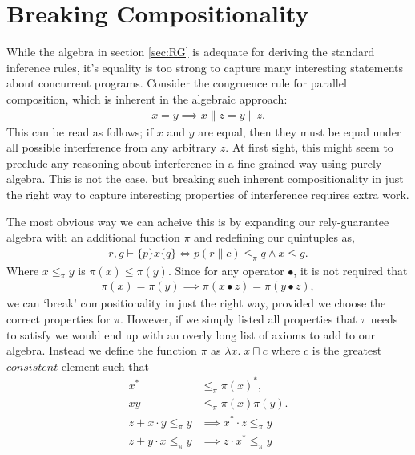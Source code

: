 \documentclass{llncs}
\begin{document}
\section{Breaking Compositionality}
\label{sec:INT}

While the algebra in section \ref{sec:RG} is adequate for deriving the
standard inference rules, it's equality is too strong to capture many
interesting statements about concurrent programs. Consider the
congruence rule for parallel composition, which is inherent in the
algebraic approach:
\begin{align*}
x = y \implies x\|z = y\|z.
\end{align*}
This can be read as follows; if $x$ and $y$ are equal, then they must
be equal under all possible interference from any arbitrary $z$. At
first sight, this might seem to preclude any reasoning about
interference in a fine-grained way using purely algebra. This is not
the case, but breaking such inherent compositionality in just the
right way to capture interesting properties of interference requires
extra work.

The most obvious way we can acheive this is by expanding our
rely-guarantee algebra with an additional function $\pi$ and redefining
our quintuples as,
\begin{align*}
r, g \vdash \{p\} x \{q\} \iff p(r\|c) \le_\pi q \land x \le g.
\end{align*}
Where $x \le_\pi y$ is $\pi(x) \le \pi(y)$. Since for any operator
$\bullet$, it is not required that
\begin{align*}
\pi(x) = \pi(y) \implies \pi(x \bullet z) = \pi(y \bullet z),
\end{align*}
we can `break' compositionality in just the right way, provided we
choose the correct properties for $\pi$. However, if we simply listed
all properties that $\pi$ needs to satisfy we would end up with an
overly long list of axioms to add to our algebra. Instead we define
the function $\pi$ as $\lambda x.\; x \sqcap c$ where $c$ is the
greatest $consistent$ element such that
\begin{align}
x^* &\le_\pi \pi(x)^*, \label{con1}\\
xy &\le_\pi \pi(x)\pi(y). \label{con2}\\
z + x\cdot y \le_\pi y &\implies x^*\cdot z \le_\pi y\label{con3}\\
z + y\cdot x \le_\pi y &\implies z\cdot x^* \le_\pi y\label{con4}
\end{align}
\end{document}
